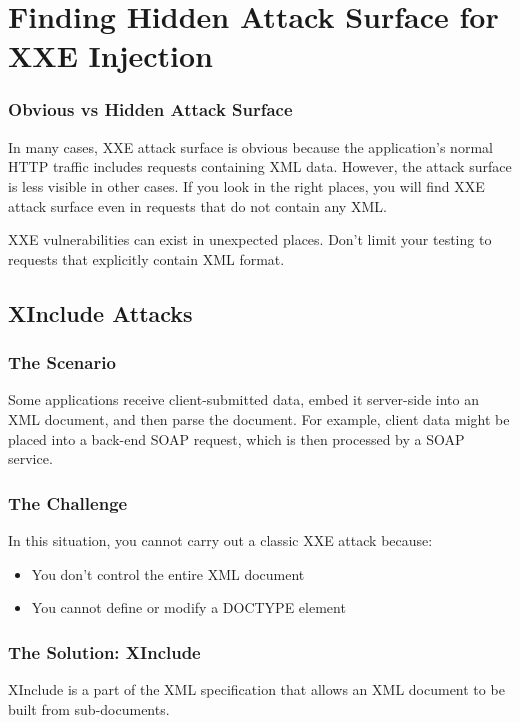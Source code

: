 \documentclass{article}
\begin{document}
\section{Finding Hidden Attack Surface for XXE Injection}

\subsubsection{Obvious vs Hidden Attack Surface}

In many cases, XXE attack surface is obvious because the application's normal HTTP traffic includes requests containing XML data. However, the attack surface is less visible in other cases. If you look in the right places, you will find XXE attack surface even in requests that do not contain any XML.

\begin{infobox}
XXE vulnerabilities can exist in unexpected places. Don't limit your testing to requests that explicitly contain XML format.
\end{infobox}

\subsection{XInclude Attacks}

\subsubsection{The Scenario}
Some applications receive client-submitted data, embed it server-side into an XML document, and then parse the document. For example, client data might be placed into a back-end SOAP request, which is then processed by a SOAP service.

\subsubsection{The Challenge}
In this situation, you cannot carry out a classic XXE attack because:
\begin{itemize}
    \item You don't control the entire XML document
    \item You cannot define or modify a DOCTYPE element
\end{itemize}

\subsubsection{The Solution: XInclude}
XInclude is a part of the XML specification that allows an XML document to be built from sub-documents.
\end{document}
